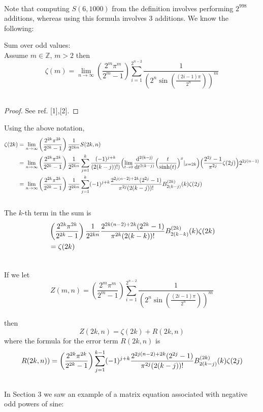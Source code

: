 \documentclass[fleqn,a4paper,9pt]{article}
\begin{document}
\begin{flushleft}
\begin{align}
\end{align}
Note that computing $S(6,1000)$ from the definition involves performing $2^{998}$ additions, whereas using this formula involves 3 additions.
We know the following:
\begin{proposition}
Sum over odd values:\\
Assume $m\in\mathbb{Z}$, $m>2$ then
$$\zeta(m)=\lim_{n\to\infty}\left(\frac{2^m\pi^m}{2^{m}-1}\right) \sum _{i=1}^{2^{n-2}}\frac{1}{ \left(2^n\sin\left(\frac{\left(2 i-1\right)\pi}{2^n}\right)\right)^m} $$\notag\\
\end{proposition}
\begin{proof}
See ref. [1],[2].
\end{proof}
Using the above notation, 
\begin{align}\notag
\zeta(2k)&=\lim_{n\to\infty}\left(\frac{2^{2k}\pi^{2k}}{2^{2k}-1}\right)\frac{1}{2^{2kn}} S(2k,n)\\\notag
&=\lim_{n\to\infty}\left(\frac{2^{2k}\pi^{2k}}{2^{2k}-1}\right)\frac{1}{2^{2kn}}  \sum_{j=1}^k\frac{(-1)^{j+k}}{(2(k-j))!)}\Bigl(\lim_{t\to 0}\frac{  \mathrm{  d^{2(k-j)}  }   }{\mathrm{d}t^{2(k-j)}  }        \Bigl(\frac{t}{\sinh(t)}\Bigr)^x\vert_{x=2 k}\Bigr)\Bigl(\frac{2^{2j}-1}{\pi^{2 j}}\zeta(2 j)\Bigr)2^{2 j (n-1)}\\\notag
&=\lim_{n\to\infty}\left(\frac{2^{2k}\pi^{2k}}{2^{2k}-1}\right)\frac{1}{2^{2kn}}\sum_{j=1}^k(-1)^{j+k}\frac{2^{2j(n-2)+2k}(2^{2j}-1)}{\pi^{2j}(2(k-j))!}B_{2(k-j)}^{(2k)}(k) \zeta(2 j)\\\notag
\end{align}
The $k$-th term in  the sum is
\begin{align}\notag
&\left(\frac{2^{2k}\pi^{2k}}{2^{2k}-1}\right) \frac{1}{2^{2kn}} \frac{2^{2k(n-2)+2k}(2^{2k}-1)}{\pi^{2k}(2(k-k))!}B_{2(k-k)}^{(2k)}(k) \zeta(2 k)\\\notag
&= \zeta(2 k)\\\notag
\end{align}

If we let
$$Z(m,n)=\left(\frac{2^m\pi^m}{2^{m}-1}\right) \sum _{i=1}^{2^{n-2}}\frac{1}{ \left(2^n\sin\left(\frac{\left(2 i-1\right)\pi}{2^n}\right)\right)^m} $$\notag\\
then
$$Z(2k,n)=\zeta(2k)+R(2k,n)$$
where the formula for the error term $R(2k,n)$ is
\begin{align}\notag
R(2k,n))&=\left(\frac{2^{2k}\pi^{2k}}{2^{2k}-1}\right)\sum_{j=1}^{k-1}(-1)^{j+k}\frac{2^{2j(n-2)+2k}(2^{2j}-1)}{\pi^{2j}(2(k-j))!}B_{2(k-j)}^{(2k)}(k) \zeta(2 j)\\\notag
\end{align}
In Section 3 we saw an example of a matrix equation associated with negative odd powers of sine:


\end{flushleft}
\end{document}
